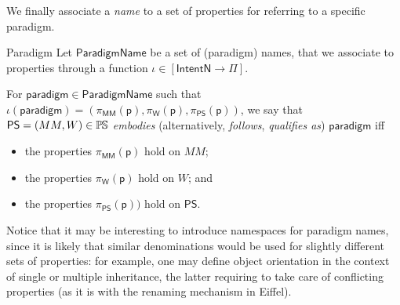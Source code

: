 We finally associate a \emph{name} to a set of properties for referring to a 
specific paradigm.
\begin{Definition}{\label{def:Paradigm}Paradigm}
Let $\mathsf{ParadigmName}$ be a set of (paradigm) names, that we associate to 
properties through a function $\iota \in [\mathsf{IntentN} \to \Pi]$.

For $\mathsf{paradigm}\in\mathsf{ParadigmName}$ such that 
$\iota(\mathsf{paradigm}) = (\pi_{\mathsf{MM}}(\mathsf{p}),                     
 \pi_{\mathsf{W}}(\mathsf{p}),                      
\pi_{\mathsf{PS}}(\mathsf{p}))$, 
we say that $\mathsf{PS} = (MM, W)\in\mathbb{P}\mskip-1mu\mathbb{S}$ \emph{embodies} (alternatively, 
\emph{follows}, \emph{qualifies as}) $\mathsf{paradigm}$ iff
\begin{itemize}
   \item the properties $\pi_{\mathsf{MM}}(\mathsf{p})$ hold on $MM$;
   \item the properties $\pi_{\mathsf{W}}(\mathsf{p})$ hold on $W$; and
   \item the properties $ \pi_{\mathsf{PS}}(\mathsf{p}))$ hold on $\mathsf{PS}$.
\end{itemize}
\end{Definition}
Notice that it may be interesting to introduce namespaces for paradigm names, 
since it is likely that similar denominations would be used for slightly 
different sets of properties: for example, one may define object orientation in 
the context of single or multiple inheritance, the latter requiring to take 
care of conflicting properties (as it is with the renaming mechanism in Eiffel).


